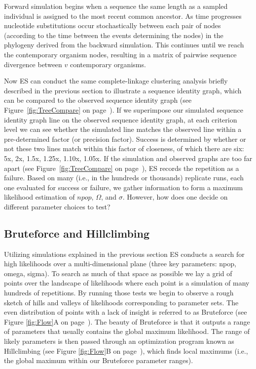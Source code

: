 Forward simulation begins when a sequence the same length as a sampled individual is assigned to the most recent common ancestor.
As time progresses nucleotide substitutions occur stochastically between each pair of nodes (according to the time between the events determining the nodes) in the phylogeny derived from the backward simulation. 
This continues until we reach the contemporary organism nodes, resulting in a matrix of pairwise sequence divergence between $v$ contemporary organisms.

Now ES can conduct the same complete-linkage clustering analysis briefly described in the previous section to illustrate a sequence identity graph, which can be compared to the observed sequence identity graph (see Figure~\ref{fig:TreeCompare} on page~\pageref{fig:TreeCompare}).
If we superimpose our simulated sequence identity graph line on the observed sequence identity graph, at each criterion level we can see whether the simulated line matches the observed line within a pre-determined factor (or precision factor).
Success is determined by whether or not these two lines match within this factor of closeness, of which there are six: 5x, 2x, 1.5x, 1.25x, 1.10x, 1.05x.
If the simulation and observed graphs are too far apart (see Figure~\ref{fig:TreeCompare} on page~\pageref{fig:TreeCompare}), ES records the repetition as a failure.
Based on many (i.e., in the hundreds or thousands) replicate runs, each one evaluated for success or failure, we gather information to form a maximum likelihood estimation of $npop$, $\Omega$, and $\sigma$. However, how does one decide on different parameter choices to test?

\subsection*{Bruteforce and Hillclimbing}
Utilizing simulations explained in the previous section ES conducts a search for high likelihoods over a multi-dimensional plane (three key parameters: npop, omega, sigma).
To search as much of that space as possible we lay a grid of points over the landscape of likelihoods where each point is a simulation of many hundreds of repetitions.
By running those tests we begin to observe a rough sketch of hills and valleys of likelihoods corresponding to parameter sets.
The even distribution of points with a lack of insight is referred to as Bruteforce (see Figure \ref{fig:Flow}A on page~\pageref{fig:Flow}).
The beauty of Bruteforce is that it outputs a range of parameters that usually contains the global maximum likelihood.
The range of likely parameters is then passed through an optimization program known as Hillclimbing (see Figure \ref{fig:Flow}B on page~\pageref{fig:Flow}), which finds local maximums (i.e., the global maximum within our Bruteforce parameter ranges).

